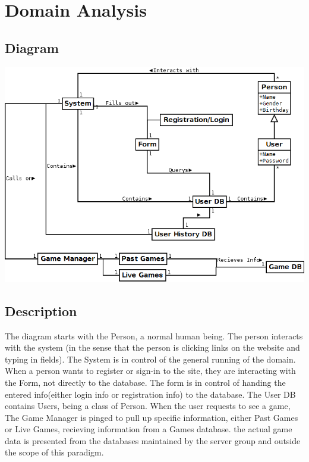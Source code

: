 \section{Domain Analysis}
	\subsection{Diagram}
	
	
	\includegraphics[width=1.0\textwidth]{./Diagram1.png}
	
	\subsection{Description}

	The diagram starts with the Person, a normal human being. The person interacts with the system (in the sense that the person is clicking links on the website and typing in fields). The System is in control of the general running of the domain. When a person wants to register or sign-in to the site, they are interacting with the Form, not directly to the database. The form is in control of handing the entered info(either login info or registration info) to the database. The User DB contains Users, being a class of Person. When the user requests to see a game, The Game Manager is pinged to pull up specific information, either Past Games or Live Games, recieving information from a Games database. the actual game data is presented from the databases maintained by the server group and outside the scope of this paradigm. 
	
	